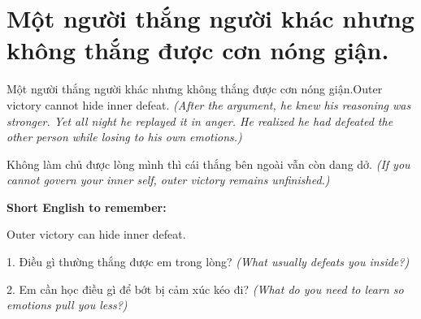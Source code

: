 \section{Một người thắng người khác nhưng không thắng được cơn nóng giận.}
\begin{truyen}{Một người thắng người khác nhưng không thắng được cơn nóng giận.}{Outer victory cannot hide inner defeat.}
\textit{(After the argument, he knew his reasoning was stronger. Yet all night he replayed it in anger. He realized he had defeated the other person while losing to his own emotions.)}
\end{truyen}
\begin{baihoc}
Không làm chủ được lòng mình thì cái thắng bên ngoài vẫn còn dang dở.
\textit{(If you cannot govern your inner self, outer victory remains unfinished.)}
\end{baihoc}
\begin{ghinhoanh}\textbf{Short English to remember:}

Outer victory can hide inner defeat.
\end{ghinhoanh}
\begin{tuhocnhanh}
1. Điều gì thường thắng được em trong lòng? \textit{(What usually defeats you inside?)}

2. Em cần học điều gì để bớt bị cảm xúc kéo đi? \textit{(What do you need to learn so emotions pull you less?)}
\end{tuhocnhanh}
\ngancach

